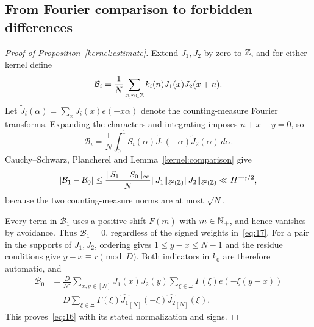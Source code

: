 \subsection{From Fourier comparison to forbidden differences}

\begin{proof}[Proof of Proposition~\ref{kernel:estimate}]
Extend $J_1,J_2$ by zero to $\mathbb Z$, and for either kernel define
\[
 \mathcal B_i=\frac1N\sum_{x,n\in\mathbb Z}k_i(n)J_1(x)J_2(x+n).
\]
Let $\widetilde J_i(\alpha)=\sum_xJ_i(x)e(-x\alpha)$ denote the
counting-measure Fourier transforms. Expanding the characters and
integrating imposes $n+x-y=0$, so
\[
 \mathcal B_i=\frac1N\int_0^1
 S_i(\alpha)\widetilde J_1(-\alpha)\widetilde J_2(\alpha)\,d\alpha.
\]
Cauchy--Schwarz, Plancherel and Lemma~\ref{kernel:comparison} give
\[
 |\mathcal B_1-\mathcal B_0|
 \le\frac{\|S_1-S_0\|_\infty}{N}
             \|J_1\|_{\ell^2(\mathbb Z)}\|J_2\|_{\ell^2(\mathbb Z)}
 \ll H^{-\gamma/2},
\]
because the two counting-measure norms are at most $\sqrt N$.

Every term in $\mathcal B_1$ uses a positive shift $F(m)$ with
$m\in\mathbb N_+$, and hence vanishes by avoidance. Thus
$\mathcal B_1=0$, regardless of the signed weights in~\eqref{eq:17}.
For a pair in the supports of $J_1,J_2$, ordering gives
$1\le y-x\le N-1$ and the residue conditions give
$y-x\equiv r\pmod D$. Both indicators in $k_0$ are therefore
automatic, and
\begin{align*}
 \mathcal B_0
 &=\frac D{N^2}\sum_{x,y\in[N]}J_1(x)J_2(y)
                    \sum_{\xi\in\Xi}\Gamma(\xi)e(-\xi(y-x))\\
 &=D\sum_{\xi\in\Xi}\Gamma(\xi)
                    \widehat{J_1}_{[N]}(-\xi)\widehat{J_2}_{[N]}(\xi).
\end{align*}
This proves~\eqref{eq:16} with its stated normalization and signs.
\end{proof}
